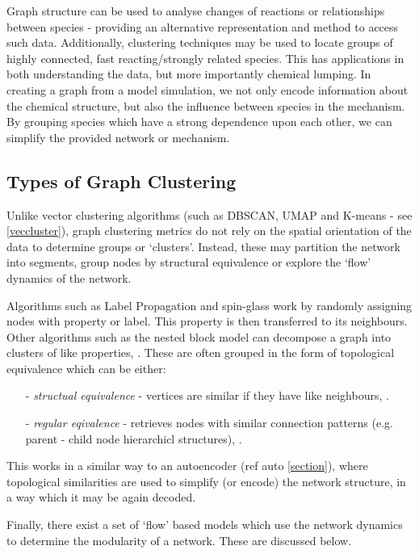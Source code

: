 Graph structure can be used to analyse changes of reactions or relationships between species - providing an alternative representation and method to access such data. Additionally, clustering techniques may be used to locate groups of highly connected, fast reacting/strongly related species. This has applications in both understanding the data, but more importantly chemical lumping. In creating a graph from a model simulation, we not only encode information about the chemical structure, but also the influence between species in the mechanism. By grouping species which have a strong dependence upon each other, we can simplify the provided network or mechanism. 

 \subsection{Types of Graph Clustering}
Unlike vector clustering algorithms (such as DBSCAN, UMAP and K-means - see \autoref{veccluster}), graph clustering metrics do not rely on the spatial orientation of the data to determine groups or `clusters'. Instead, these may partition the network into segments, group nodes by structural equivalence or explore the `flow' dynamics of the network.

Algorithms such as Label Propagation \citep{labelprop} and spin-glass \citep{spinglass} work by randomly assigning nodes with property or label. This property is then transferred to its neighbours. Other algorithms such as the nested block model can decompose a graph into clusters of like properties, \citep{communitygraph}. These are often grouped in the form of topological equivalence which can be either:
\begin{itemize}
    \item[-]\textit{structual equivalence} - vertices are similar if they have like neighbours, \citep{strueq}.
    \item[-]\textit{regular eqivalence} - retrieves nodes with similar connection patterns (e.g. parent - child node hierarchicl structures), \citep{regequiv}.
\end{itemize}
This works in a similar way to an autoencoder (ref auto \autoref{section}), where topological similarities are used to simplify (or encode) the network structure, in a way which it may be again decoded.

Finally, there exist a set of `flow' based models which use the network dynamics to determine the modularity of a network. These are discussed below.

